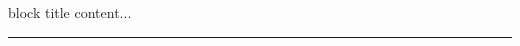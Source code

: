 \documentclass{beamer}
\begin{document}
\begin{frame}
    \begin{alertblock}{block title}
        content...
    \end{alertblock}

    {\rule{\textwidth}{2pt}}

\end{frame} 
\end{document}
